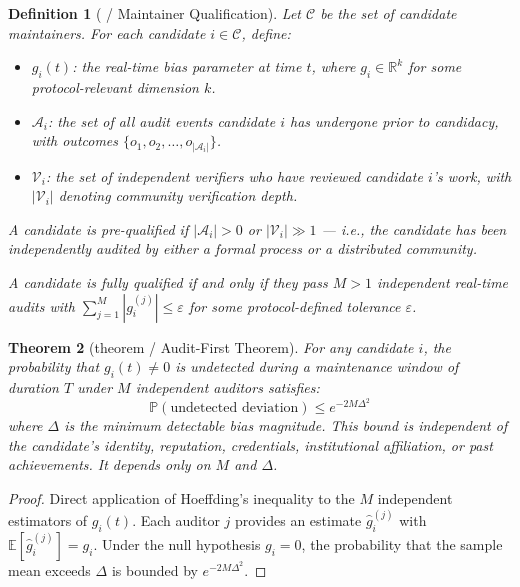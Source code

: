 \documentclass[12pt,a4paper]{article}
\newtheorem{theorem}{Theorem}[section]
\newtheorem{definition}[theorem]{Definition}
\theoremstyle{remark}
\newcommand{\R}{\mathbb{R}}
\newcommand{\E}{\mathbb{E}}
\newcommand{\Pbb}{\mathbb{P}}
\newcommand{\rotationPeriod}{T}
\newcommand{\biasParam}{g}
\begin{document}
\begin{definition}[ / Maintainer Qualification]
Let $\mathcal{C}$ be the set of candidate maintainers. For each candidate
$i \in \mathcal{C}$, define:
\begin{itemize}[leftmargin=*]
    \item $\biasParam_i(t)$: the real-time bias parameter at time $t$, where
          $\biasParam_i \in \R^k$ for some protocol-relevant dimension $k$.
    \item $\mathcal{A}_i$: the set of all audit events candidate $i$ has
          undergone prior to candidacy, with outcomes
          $\{o_1, o_2, \ldots, o_{|\mathcal{A}_i|}\}$.
    \item $\mathcal{V}_i$: the set of independent verifiers who have reviewed
          candidate $i$'s work, with $|\mathcal{V}_i|$ denoting community
          verification depth.
\end{itemize}
A candidate is \textit{pre-qualified} if $|\mathcal{A}_i| > 0$ or
$|\mathcal{V}_i| \gg 1$ — i.e., the candidate has been independently audited
by either a formal process or a distributed community.

A candidate is \textit{fully qualified} if and only if they pass $M > 1$
independent real-time audits with $\sum_{j=1}^{M} |\biasParam_i^{(j)}| \leq
\varepsilon$ for some protocol-defined tolerance $\varepsilon$.
\end{definition}

\begin{theorem}[theorem / Audit-First Theorem]
\label{thm:audit-first}
For any candidate $i$, the probability that $\biasParam_i(t) \neq 0$ is
undetected during a maintenance window of duration $\rotationPeriod$ under
$M$ independent auditors satisfies:
\begin{equation}
    \Pbb(\text{undetected deviation}) \leq e^{-2M\Delta^2}
    \label{eq:hoeffding-bound}
\end{equation}
where $\Delta$ is the minimum detectable bias magnitude. This bound is
independent of the candidate's identity, reputation, credentials,
institutional affiliation, or past achievements. It depends only on $M$
and $\Delta$.
\end{theorem}

\begin{proof}
Direct application of Hoeffding's inequality to the $M$ independent
estimators of $\biasParam_i(t)$. Each auditor $j$ provides an estimate
$\hat{g}_i^{(j)}$ with $\E[\hat{g}_i^{(j)}] = \biasParam_i$. Under the null
hypothesis $\biasParam_i = 0$, the probability that the sample mean exceeds
$\Delta$ is bounded by $e^{-2M\Delta^2}$.
\end{proof}
\end{document}
